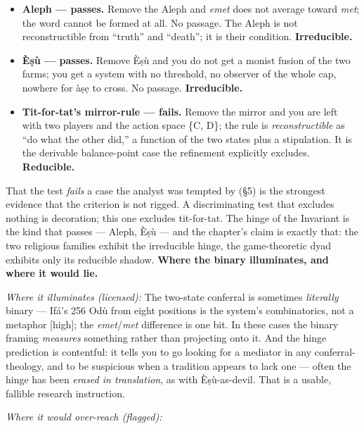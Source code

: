 \documentclass[11pt]{article}
\begin{document}
\begin{itemize}
\item \textbf{Aleph — passes.} Remove the Aleph and \emph{emet} does not average toward \emph{met}; the word cannot be formed at all. No passage. The Aleph is not reconstructible from ``truth'' and ``death''; it is their condition. \textbf{Irreducible.}
\item \textbf{Èṣù — passes.} Remove Èṣù and you do not get a monist fusion of the two farms; you get a system with no threshold, no observer of the whole cap, nowhere for àṣẹ to cross. No passage. \textbf{Irreducible.}
\item \textbf{Tit-for-tat's mirror-rule — fails.} Remove the mirror and you are left with two players and the action space \{C, D\}; the rule is \emph{reconstructible} as ``do what the other did,'' a function of the two states plus a stipulation. It is the derivable balance-point case the refinement explicitly excludes. \textbf{Reducible.}
\end{itemize}

That the test \emph{fails} a case the analyst was tempted by (§5) is the strongest evidence that the criterion is not rigged. A discriminating test that excludes nothing is decoration; this one excludes tit-for-tat. The hinge of the Invariant is the kind that passes — Aleph, Èṣù — and the chapter's claim is exactly that: the two religious families exhibit the irreducible hinge, the game-theoretic dyad exhibits only its reducible shadow.  \textbf{Where the binary illuminates, and where it would lie.}

\emph{Where it illuminates (licensed):} The two-state conferral is sometimes \emph{literally} binary — Ifá's 256 Odù from eight positions is the system's combinatorics, not a metaphor [high]; the \emph{emet}/\allowbreak{}\emph{met} difference is one bit. In these cases the binary framing \emph{measures} something rather than projecting onto it. And the hinge prediction is contentful: it tells you to go looking for a mediator in any conferral-theology, and to be suspicious when a tradition appears to lack one — often the hinge has been \emph{erased in translation}, as with Èṣù-as-devil. That is a usable, fallible research instruction.

\emph{Where it would over-reach (flagged):}
\end{document}
